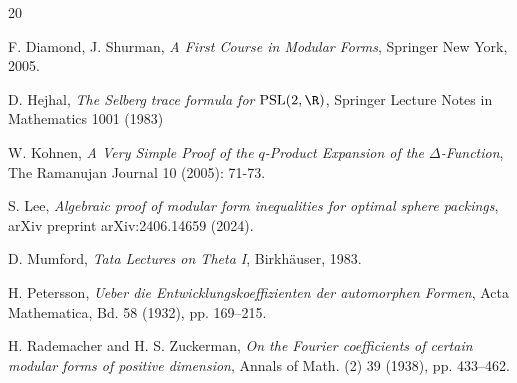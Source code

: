 \begin{thebibliography}{20}

 {\sc F. Diamond, J. Shurman}, \emph{A First Course in Modular Forms}, Springer New York, 2005.



 {\sc D. Hejhal}, {\em The Selberg trace formula for $\mathrm{PSL}(2, \R)$},  Springer Lecture Notes in Mathematics 1001 (1983)


 {\sc W. Kohnen}, {\em A Very Simple Proof of the $q$-Product Expansion of the $\Delta$-Function}, The Ramanujan Journal 10 (2005): 71-73.

 {\sc S. Lee}, {\em Algebraic proof of modular form inequalities for optimal sphere packings}, arXiv preprint arXiv:2406.14659 (2024).

 {\sc D. Mumford}, {\em Tata Lectures on Theta I}, Birkh\"auser, 1983.



 {\sc H. Petersson}, {\em Ueber die Entwicklungskoeffizienten der automorphen Formen}, Acta Mathematica, Bd. 58 (1932),  pp. 169--215.


 {\sc H. Rademacher and H. S. Zuckerman}, {\em On the Fourier coefficients of certain modular forms of
positive dimension}, Annals of Math. (2) 39 (1938),  pp. 433--462.


\end{thebibliography}
